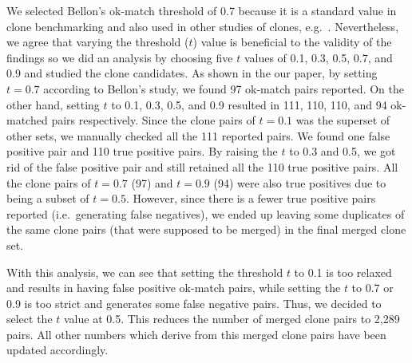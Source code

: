 \documentclass[a4paper,twoside,10pt]{reviewresponse}
\begin{document}
We selected Bellon's ok-match threshold of 0.7 because it is a standard value in
clone benchmarking \citep{Bellon2007} and also used in other studies of clones,
e.g.~\cite{Sajnani2016}. Nevertheless, we agree that varying the threshold ($t$)
value is beneficial to the validity of the findings so we did an analysis by
choosing five $t$ values of 0.1, 0.3, 0.5, 0.7, and 0.9 and studied the clone
candidates. As shown in the our paper, by setting $t=0.7$ according to Bellon's
study, we found 97 ok-match pairs reported. On the other hand, setting $t$ to
0.1, 0.3, 0.5, and 0.9 resulted in 111, 110, 110, and 94 ok-matched pairs
respectively. Since the clone pairs of $t=0.1$ was the superset of other sets, 
we manually checked all the 111 reported pairs. We found one false positive pair
and 110 true positive pairs. By raising the $t$ to 0.3 and 0.5, we got rid of
the false positive pair and still retained all the 110 true positive pairs. All
the clone pairs of $t=0.7$ (97) and $t=0.9$ (94) were also true positives due to
being a subset of $t=0.5$. However, since there is a fewer true positive pairs
reported (i.e.~generating false negatives), we ended up leaving some duplicates
of the same clone pairs (that were supposed to be merged) in the final merged
clone set.

With this analysis, we can see that setting the threshold $t$ to 0.1 is too
relaxed and results in having false positive ok-match pairs, while setting the
$t$ to 0.7 or 0.9 is too strict and generates some false negative pairs. Thus,
we decided to select the $t$ value at 0.5. This reduces the number of merged
clone pairs to 2,289 pairs. All other numbers which derive from this merged
clone pairs have been updated accordingly.

\end{document}
